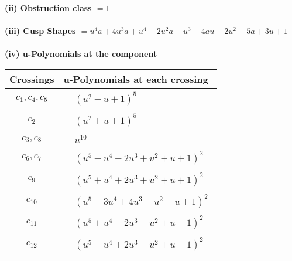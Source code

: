 \documentclass[1p]{elsarticle_modified}
\theoremstyle{definition}
\begin{document}
\flushleft \textbf{(ii) Obstruction class $= 1$}\\~\\
\flushleft \textbf{(iii) Cusp Shapes $= u^4 a+4 u^3 a+u^4-2 u^2 a+u^3-4 a u-2 u^2-5 a+3 u+1$}\\~\\
\newpage\renewcommand{\arraystretch}{1}
\flushleft \textbf{(iv) u-Polynomials at the component}\newline \\
\begin{tabular}{m{50pt}|m{274pt}}
Crossings & \hspace{64pt}u-Polynomials at each crossing \\
\hline $$\begin{aligned}c_{1},c_{4},c_{5}\end{aligned}$$&$\begin{aligned}
&(u^2- u+1)^5
\end{aligned}$\\
\hline $$\begin{aligned}c_{2}\end{aligned}$$&$\begin{aligned}
&(u^2+u+1)^5
\end{aligned}$\\
\hline $$\begin{aligned}c_{3},c_{8}\end{aligned}$$&$\begin{aligned}
&u^{10}
\end{aligned}$\\
\hline $$\begin{aligned}c_{6},c_{7}\end{aligned}$$&$\begin{aligned}
&(u^5- u^4-2 u^3+u^2+u+1)^2
\end{aligned}$\\
\hline $$\begin{aligned}c_{9}\end{aligned}$$&$\begin{aligned}
&(u^5+u^4+2 u^3+u^2+u+1)^2
\end{aligned}$\\
\hline $$\begin{aligned}c_{10}\end{aligned}$$&$\begin{aligned}
&(u^5-3 u^4+4 u^3- u^2- u+1)^2
\end{aligned}$\\
\hline $$\begin{aligned}c_{11}\end{aligned}$$&$\begin{aligned}
&(u^5+u^4-2 u^3- u^2+u-1)^2
\end{aligned}$\\
\hline $$\begin{aligned}c_{12}\end{aligned}$$&$\begin{aligned}
&(u^5- u^4+2 u^3- u^2+u-1)^2
\end{aligned}$\\
\hline
\end{tabular}\\~\\
\end{document}
